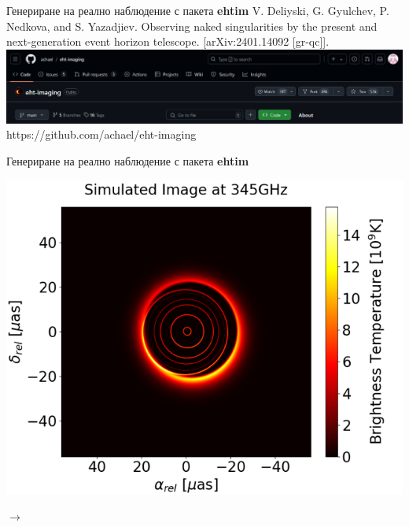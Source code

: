 \documentclass[hyperref={colorlinks,citecolor=blue,linkcolor=blue,urlcolor=blue}]{beamer}
\begin{document}
\begin{frame}{Генериране на реално наблюдение с пакета \textbf{ehtim}}
		\tiny V. Deliyski, G. Gyulchev, P. Nedkova, and S. Yazadjiev. Observing naked singularities
		by the present and next-generation event horizon telescope. [arXiv:2401.14092 [gr-qc]].\\
		
		\includegraphics[scale = 0.35]{Pre-Defence/ehtim_github.png}
		\tiny https://github.com/achael/eht-imaging
	\end{frame}
	
	\begin{frame}{Генериране на реално наблюдение с пакета \textbf{ehtim}}
		\centering
		\begin{minipage}{13em}
			\includegraphics[scale = 0.50]{Pre-Defence/GB_ray_tracer_345.png}
		\end{minipage}\qquad$\rightarrow$
		\begin{minipage}{13em}

\end{minipage}
\end{frame}
\end{document}
